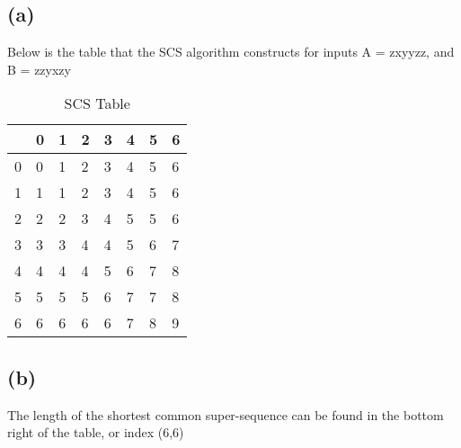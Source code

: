 \documentclass[12pt]{article}
\begin{document}
\subsection*{(a)}
Below is the table that the SCS algorithm constructs for inputs A = zxyyzz, and B = zzyxzy\\
\begin{table}[H]
\centering
\caption{SCS Table}
\label{my-label}
\begin{tabular}{l|lllllll}
  & 0 & 1 & 2 & 3 & 4 & 5 & 6 \\ \hline
0 & 0 & 1 & 2 & 3 & 4 & 5 & 6 \\
1 & 1 & 1 & 2 & 3 & 4 & 5 & 6 \\
2 & 2 & 2 & 3 & 4 & 5 & 5 & 6 \\
3 & 3 & 3 & 4 & 4 & 5 & 6 & 7 \\
4 & 4 & 4 & 4 & 5 & 6 & 7 & 8 \\
5 & 5 & 5 & 5 & 6 & 7 & 7 & 8 \\
6 & 6 & 6 & 6 & 6 & 7 & 8 & 9
\end{tabular}
\end{table}

\subsection*{(b)}
The length of the shortest common super-sequence can be found in the bottom right of the table, or index (6,6)\\
\end{document}
